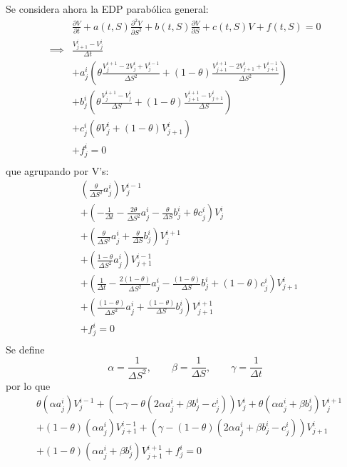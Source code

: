 Se considera ahora la EDP parabólica general:
\begin{align*}
    &\frac{\partial V}{\partial t} + a(t,S) \frac{\partial^2 V}{\partial S^2} + b(t,S) \frac{\partial V}{\partial S} + c(t,S) V + f(t,S) = 0 \\
    \implies &\frac{V_{j+1}^i - V_j^i}{\Delta t} \\
    &+ a_j^i \left( \theta \frac{V_j^{i+1} - 2V_j^i + V_j^{i-1}}{\Delta S^2}  + (1-\theta) \frac{V_{j+1}^{i+1} - 2V_{j+1}^i + V_{j+1}^{i-1}}{\Delta S^2} \right) \\
    &+ b_j^i \left( \theta \frac{V_j^{i+1} - V_j^i}{\Delta S} + (1-\theta) \frac{V_{j+1}^{i+1} - V_{j+1}^i}{\Delta S} \right)\\
    &+ c_j^i \left( \theta V_j^i + (1-\theta) V_{j+1}^i \right) \\
    &+ f_j^i = 0 \\
\end{align*}
que agrupando por V's:
\begin{align*}
    &\left( \frac{\theta}{\Delta S^2} a_j^i \right)V_j^{i-1} \\
    &+\left( -\frac{1}{\Delta t} - \frac{2\theta}{\Delta S^2}a_j^i  - \frac{\theta}{\Delta S}b_j^i + \theta c_j^i \right)V_j^i \\
    &+\left( \frac{\theta}{\Delta S^2} a_j^i + \frac{\theta}{\Delta S}b_j^i \right)V_j^{i+1} \\
    &+\left( \frac{1-\theta}{\Delta S^2} a_j^i \right)V_{j+1}^{i-1} \\
    &+\left( \frac{1}{\Delta t} - \frac{2(1-\theta)}{\Delta S^2}a_j^i - \frac{(1-\theta)}{\Delta S}b_j^i + (1-\theta) c_j^i \right)V_{j+1}^i \\
    &+\left( \frac{(1-\theta)}{\Delta S^2} a_j^i + \frac{(1-\theta)}{\Delta S}b_j^i \right)V_{j+1}^{i+1} \\
    &+ f_j^i = 0 \\
\end{align*}
Se define
\begin{equation*}
    \alpha = \frac{1}{\Delta S^2}, \qquad \beta = \frac{1}{\Delta S}, \qquad \gamma = \frac{1}{\Delta t}
\end{equation*}
por lo que
\begin{align*}
    &\theta\left( \alpha a_j^i \right)V_j^{i-1} +\left( -\gamma - \theta (2\alpha a_j^i  + \beta b_j^i - c_j^i) \right)V_j^i +\theta\left( \alpha a_j^i + \beta b_j^i \right)V_j^{i+1} \\
    &+(1-\theta)\left( \alpha a_j^i \right)V_{j+1}^{i-1} +\left( \gamma - (1-\theta) (2\alpha a_j^i + \beta b_j^i - c_j^i) \right)V_{j+1}^i \\
    &+(1-\theta)\left( \alpha a_j^i + \beta b_j^i \right)V_{j+1}^{i+1} + f_j^i = 0 \\
\end{align*}
